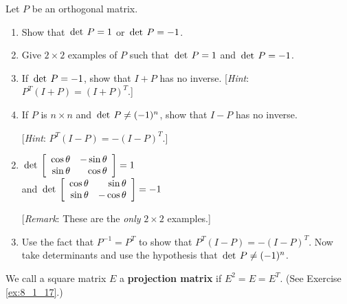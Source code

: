 \begin{multicols}{2}
\begin{ex}
Let $P$ be an orthogonal matrix.


\begin{enumerate}[label={\alph*.}]
\item Show that $\thinspace\operatorname{det\medspace}P = 1$ or $\thinspace\operatorname{det\medspace}P = -1$.

\item Give $2 \times 2$ examples of $P$ such that $\thinspace\operatorname{det\medspace}P = 1$ and $\thinspace\operatorname{det\medspace} P = -1$.

\item If $\thinspace\operatorname{det\medspace} P = -1$, show that $I + P$ has no inverse. [\textit{Hint}: $P^{T}(I + P) = (I + P)^{T}$.]

\item If $P$ is $n \times n$ and $\thinspace\operatorname{det\medspace}P \neq (-1)^{n}$, show that $I - P$ has no inverse.


[\textit{Hint}: $P^{T}(I - P) = -(I - P)^{T}$.]

\end{enumerate}
\begin{sol} 
\begin{enumerate}[label={\alph*.}]
\setcounter{enumi}{1}
\item $\thinspace\operatorname{det\medspace}\left[ \begin{array}{rr}
\cos\theta & -\sin\theta \\
\sin\theta & \cos\theta
\end{array}\right] = 1$ \\ and $\thinspace\operatorname{det\medspace}\left[ \begin{array}{rr}
\cos\theta & \sin\theta \\
\sin\theta & -\cos\theta
\end{array}\right] = -1$

[\textit{Remark}: These are the \textit{only} $2 \times 2$ examples.]

\setcounter{enumi}{3}
\item Use the fact that $P^{-1} = P^{T}$ to show that $P^{T}(I - P) = -(I - P)^{T}$. Now take determinants and use the hypothesis that $\thinspace\operatorname{det\medspace}P \neq (-1)^{n}$.

\end{enumerate}
\end{sol}
\end{ex}

\begin{ex}
We call a square matrix $E$ a \textbf{projection matrix} if $E^{2} = E = E^{T}$. (See Exercise \ref{ex:8_1_17}.)



\end{ex}
\end{multicols}
